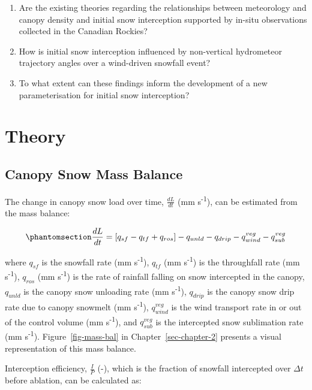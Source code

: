 \documentclass[
  letterpaper,
]{tex/uofsthesis-cs}
\begin{document}
\begin{enumerate}
\def\labelenumi{\arabic{enumi}.}
\item
  Are the existing theories regarding the relationships between
  meteorology and canopy density and initial snow interception supported
  by in-situ observations collected in the Canadian Rockies?
\item
  How is initial snow interception influenced by non-vertical
  hydrometeor trajectory angles over a wind-driven snowfall event?
\item
  To what extent can these findings inform the development of a new
  parameterisation for initial snow interception?
\end{enumerate}

\section{Theory}\label{theory}

\subsection{Canopy Snow Mass Balance}\label{canopy-snow-mass-balance}

The change in canopy snow load over time, \(\frac{dL}{dt}\) (mm
s\textsuperscript{-1}), can be estimated from the mass balance:

\begin{equation}\phantomsection\label{eq-canopy-mass-bal-03}{
\frac{dL}{dt} = 
[q_{sf} - q_{tf} + q_{ros}] - q_{unld} - q_{drip} - q_{wind}^{veg} - q_{sub}^{veg}
}\end{equation}

where \(q_{sf}\) is the snowfall rate (mm s\textsuperscript{-1}),
\(q_{tf}\) (mm s\textsuperscript{-1}) is the throughfall rate (mm
s\textsuperscript{-1}), \(q_{ros}\) (mm s\textsuperscript{-1}) is the
rate of rainfall falling on snow intercepted in the canopy, \(q_{unld}\)
is the canopy snow unloading rate (mm s\textsuperscript{-1}),
\(q_{drip}\) is the canopy snow drip rate due to canopy snowmelt (mm
s\textsuperscript{-1}), \(q_{wind}^{veg}\) is the wind transport rate in
or out of the control volume (mm s\textsuperscript{-1}), and
\(q_{sub}^{veg}\) is the intercepted snow sublimation rate (mm
s\textsuperscript{-1}). Figure~\ref{fig-mass-bal} in
Chapter~\ref{sec-chapter-2} presents a visual representation of this
mass balance.

Interception efficiency, \(\frac{I}{P}\) (-), which is the fraction of
snowfall intercepted over \(\Delta t\) before ablation, can be
calculated as:
\end{document}
